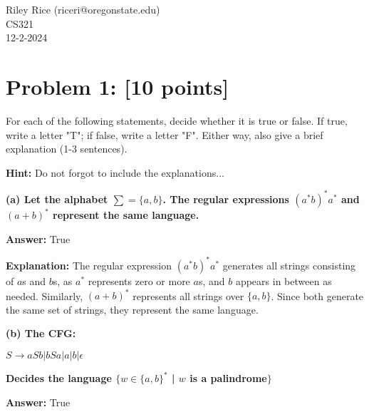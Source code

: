 \documentclass[11pt, letterpaper]{article}
\begin{document}
\noindent Riley Rice (riceri@oregonstate.edu)\\CS321\\12-2-2024

\begin{center}\end{center}

\section*{Problem 1: [10 points]}

\noindent For each of the following statements, decide whether it is true or false. If true, write a letter "T"; if false, write a letter "F". Either way, also give a brief explanation (1-3 sentences).

\vspace{2mm}

\noindent\textbf{Hint:} Do not forgot to include the explanations...

\vspace{5mm}

\noindent \textbf{(a) Let the alphabet $\sum = \{a, b\}$. The regular expressions $(a^*b)^*a^*$ and $(a + b)^*$ represent the same language.}

\vspace{2mm}

\noindent\textbf{Answer:} True

\noindent \textbf{Explanation:} The regular expression $(a^*b)^*a^*$ generates all strings consisting of $a$s and $b$s, as $a^*$ represents zero or more $a$s, and $b$ appears in between as needed. Similarly, $(a+b)^*$ represents all strings over $\{a,b\}$. Since both generate the same set of strings, they represent the same language.

\vspace{5mm}

\noindent \textbf{(b) The CFG:} 

\vspace{2mm}

\textbf{$S \rightarrow aSb|bSa|a|b|\epsilon$}

\vspace{2mm}

\noindent \textbf{Decides the language $\{w \in \{a, b\}^*$ | $w$ is a palindrome$\}$}

\vspace{2mm}

\noindent\textbf{Answer:} True
\end{document}
